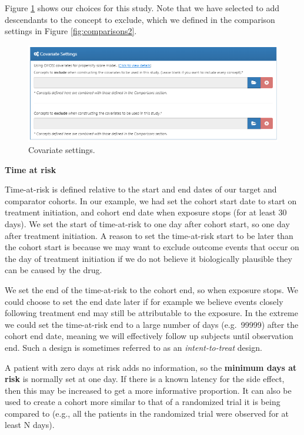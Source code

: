 \documentclass[11pt]{book}
\theoremstyle{definition}
\theoremstyle{definition}
\theoremstyle{definition}
\theoremstyle{remark}
\begin{document}
Figure \ref{fig:covariateSettings} shows our choices for this study. Note that we have selected to add descendants to the concept to exclude, which we defined in the comparison settings in Figure \ref{fig:comparisons2}.

\begin{figure}

{\centering \includegraphics[width=1\linewidth]{images/PopulationLevelEstimation/covariateSettings} 

}

\caption{Covariate settings.}\label{fig:covariateSettings}
\end{figure}

\textbf{Time at risk}

Time-at-risk is defined relative to the start and end dates of our target and comparator cohorts. In our example, we had set the cohort start date to start on treatment initiation, and cohort end date when exposure stops (for at least 30 days). We set the start of time-at-risk to one day after cohort start, so one day after treatment initiation. A reason to set the time-at-risk start to be later than the cohort start is because we may want to exclude outcome events that occur on the day of treatment initiation if we do not believe it biologically plausible they can be caused by the drug.

We set the end of the time-at-risk to the cohort end, so when exposure stops. We could choose to set the end date later if for example we believe events closely following treatment end may still be attributable to the exposure. In the extreme we could set the time-at-risk end to a large number of days (e.g.~99999) after the cohort end date, meaning we will effectively follow up subjects until observation end. Such a design is sometimes referred to as an \emph{intent-to-treat} design.

A patient with zero days at risk adds no information, so the \textbf{minimum days at risk} is normally set at one day. If there is a known latency for the side effect, then this may be increased to get a more informative proportion. It can also be used to create a cohort more similar to that of a randomized trial it is being compared to (e.g., all the patients in the randomized trial were observed for at least N days).
\end{document}

